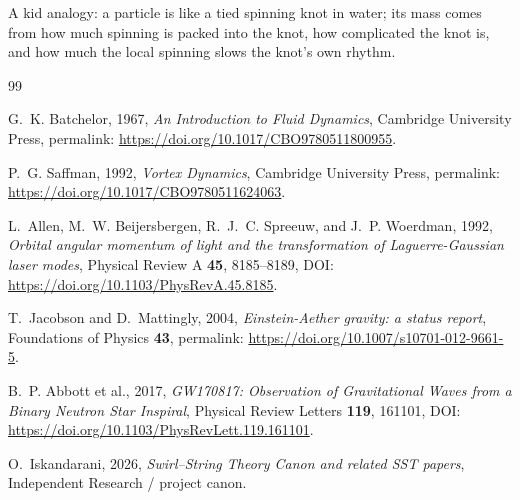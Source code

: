 \documentclass[11pt,a4paper]{article}
\begin{document}
            A kid analogy: a particle is like a tied spinning knot in water; its mass comes from how much spinning is packed into the knot, how complicated the knot is, and how much the local spinning slows the knot’s own rhythm.
            
            \begin{thebibliography}{99}
                
                G.~K. Batchelor, 1967,
                \textit{An Introduction to Fluid Dynamics},
                Cambridge University Press,
                permalink: \url{https://doi.org/10.1017/CBO9780511800955}.
                
                P.~G. Saffman, 1992,
                \textit{Vortex Dynamics},
                Cambridge University Press,
                permalink: \url{https://doi.org/10.1017/CBO9780511624063}.
                
                L.~Allen, M.~W. Beijersbergen, R.~J.~C. Spreeuw, and J.~P. Woerdman, 1992,
                \textit{Orbital angular momentum of light and the transformation of Laguerre-Gaussian laser modes},
                Physical Review A \textbf{45}, 8185--8189,
                DOI: \url{https://doi.org/10.1103/PhysRevA.45.8185}.
                
                T.~Jacobson and D.~Mattingly, 2004,
                \textit{Einstein-Aether gravity: a status report},
                Foundations of Physics \textbf{43},
                permalink: \url{https://doi.org/10.1007/s10701-012-9661-5}.
                
                B.~P. Abbott et al., 2017,
                \textit{GW170817: Observation of Gravitational Waves from a Binary Neutron Star Inspiral},
                Physical Review Letters \textbf{119}, 161101,
                DOI: \url{https://doi.org/10.1103/PhysRevLett.119.161101}.
                
                O.~Iskandarani, 2026,
                \textit{Swirl--String Theory Canon and related SST papers},
                Independent Research / project canon.
            
            \end{thebibliography}
    
\end{document}
